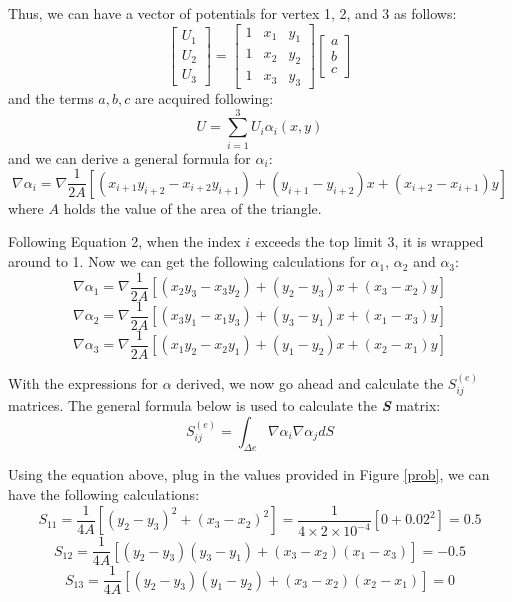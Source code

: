 \documentclass[a4paper,titlepage]{article}
\begin{document}
		Thus, we can have a vector of potentials for vertex 1, 2, and 3 as follows:
		$$
			\begin{bmatrix}
				U_1 \\ U_2 \\ U_3
			\end{bmatrix} = 
			\begin{bmatrix}
				1 & x_1 & y_1 \\
				1 & x_2 & y_2 \\
				1 & x_3 & y_3 
			\end{bmatrix}
			\begin{bmatrix}
				a \\ b \\ c
			\end{bmatrix}
		$$
		and the terms $a, b, c$ are acquired following:
		\begin{equation}
			U = \sum_{i = 1}^{3} U_i\alpha_i(x, y)
		\end{equation}
		and we can derive a general formula for $\alpha_i$:
		\begin{equation}
			\nabla \alpha_i = \nabla \frac{1}{2A}[(x_{i+1}y_{i+2}-x_{i+2}y_{i+1}) + (y_{i+1}-y_{i+2})x+(x_{i+2}-x_{i+1})y]			
		\end{equation}
		where $A$ holds the value of the area of the triangle.
		
		Following Equation 2, when the index $i$ exceeds the top limit 3, it is wrapped around to 1. Now we can get the following calculations for $\alpha_1$, $\alpha_2$ and $\alpha_3$:
		$$
			\nabla \alpha_1 = \nabla \frac{1}{2A}[(x_2y_3-x_3y_2) + (y_2-y_3)x+(x_3-x_2)y]
		$$
		$$
			\nabla \alpha_2 = \nabla \frac{1}{2A}[(x_3y_1-x_1y_3) + (y_3-y_1)x+(x_1-x_3)y]
		$$
		$$
			\nabla \alpha_3 = \nabla \frac{1}{2A}[(x_1y_2-x_2y_1) + (y_1-y_2)x+(x_2-x_1)y]
		$$
		
		With the expressions for $\alpha$ derived, we now go ahead and calculate the \textbf{$S_{ij}^{(e)}$} matrices. The general formula below is used to calculate the \textbf{\textit{S}} matrix:
		\begin{equation}
			S^{(e)}_{ij} = \int_{\Delta e} \nabla \alpha_i \nabla \alpha_j dS
		\end{equation}
		
		Using the equation above, plug in the values provided in Figure \ref{prob}, we can have the following calculations:
		$$
			S_{11} = \frac{1}{4A}[(y_2 - y_3)^2 + (x_3 - x_2)^2] = \frac{1}{4 \times 2 \times 10^{-4}}[0 + 0.02^2] = 0.5
		$$
		$$
			S_{12} = \frac{1}{4A}[(y_2 - y_3)(y_3 - y_1) + (x_3 - x_2)(x_1 - x_3)] = -0.5
		$$
		$$
			S_{13} = \frac{1}{4A}[(y_2 - y_3)(y_1 - y_2) + (x_3 - x_2)(x_2 - x_1)] = 0
		$$
		
\end{document}
